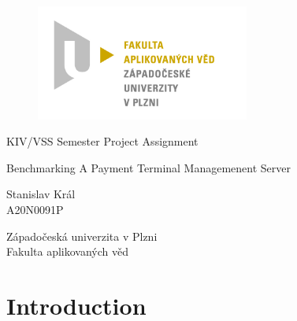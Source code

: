 \documentclass[12pt, a4paper]{article}
\let\oldsection\section
\renewcommand\section{\clearpage\oldsection}
\begin{document}
	\renewcommand{\lstlistingname}{Ukázka kódu}
	\renewcommand{\lstlistlistingname}{Seznam ukázek kódu}
    \begin{titlepage}

        \centering

        \vspace*{\baselineskip}
        \begin{figure}[H]
        \centering
        \includegraphics[width=7cm]{img/fav-logo.jpg}
        \end{figure}

        \vspace*{1\baselineskip}

        \vspace{0.75\baselineskip}

        \vspace{0.5\baselineskip}
        {KIV/VSS Semester Project Assignment}

        {\LARGE\sc Benchmarking A Payment Terminal Managemenent Server \\}

        \vspace{4\baselineskip}

        \vspace{0.5\baselineskip}

        {\sc\Large Stanislav Král \\}
        \vspace{0.5\baselineskip}
        {A20N0091P}

        \vfill

        {\sc Západočeská univerzita v Plzni\\
        Fakulta aplikovaných věd}

    \end{titlepage}

    \tableofcontents
    \pagebreak

\section{Introduction}
\end{document}
